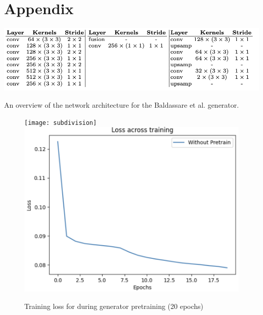 \documentclass[10pt,twocolumn,letterpaper]{article}
\begin{document}
{\small


}

\section{Appendix}


\begin{table}
\includegraphics[width=1\linewidth]{Table.png}
\caption{An overview of the network architecture for the Baldassare et al. generator.}
\end{table}
\begin{figure}
    \centering
    \texttt{[image: subdivision]}
    \includegraphics[width=0.5\linewidth]{pretraining loss.png}
    \caption{Training loss for during generator pretraining (20 epochs)}
    \label{fig:enter-label}
\end{figure}
\end{document}

